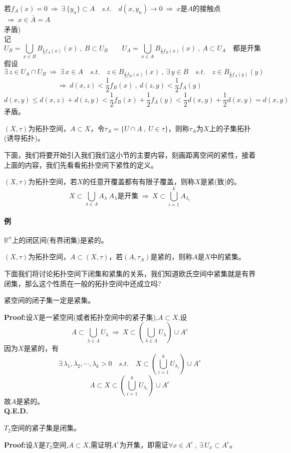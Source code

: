 若$f_A(x)=0 \ \Rightarrow \ \exists \, \{y_n\} \subset A \quad s.t. \quad d(x,y_n) \to 0 \ \Rightarrow \ x$是$A$的接触点$ \ \Rightarrow \ x \in \bar{A}=A$\\
矛盾)\\
记
\[U_B=\bigcup_{x \in B}B_{\frac{1}{2}f_A(x)}(x) \ , \ B \subset U_B \qquad U_A=\bigcup_{x \in A}B_{\frac{1}{2}f_B(x)}(x) \ , \ A \subset U_A \quad \text{都是开集}\]
假设
\[\exists \, z \in U_A \cap U_B \ \Rightarrow \ \exists \, x \in A \quad s.t. \quad z \in B_{\frac{1}{2}f_B(x)}(x) \ , \ \exists \, y \in B \quad s.t. \quad z \in B_{\frac{1}{2}f_A(y)}(y)\]
\[\Rightarrow \ d(x,z)<\frac{1}{2}f_B(x) \ , \ d(z,y)<\frac{1}{2}f_A(y)\]
\[d(x,y) \leq d(x,z)+d(z,y)<\frac{1}{2}f_B(x)+\frac{1}{2}f_A(y)<\frac{1}{2}d(x,y)+\frac{1}{2}d(x,y)=d(x,y)\]
矛盾。
\begin{definition}[子集拓扑]
    $(X,\tau)$为拓扑空间，$A \subset X$，令$\tau_A=\{U \cap A \ , \ U \in \tau\}$，则称$\tau_A$为$X$上的子集拓扑(诱导拓扑)。
\end{definition}
下面，我们将要开始引入我们我们这小节的主要内容，刻画距离空间的紧性，接着上面的内容，我们先看看拓扑空间下紧性的定义。
\begin{definition}[紧(致)性]
    $(X,\tau)$为拓扑空间，若$X$的任意开覆盖都有有限子覆盖，则称$X$是紧(致)的。
    \[X \subset \bigcup_{\lambda \in \Lambda}A_{\lambda} \ \text{$A_{\lambda}$是开集} \ \Rightarrow \ X \subset \bigcup_{i=1}^kA_{\lambda_i}\]
\end{definition}
\paragraph*{例} $\mathbb{R}^n$上的闭区间(有界闭集)是紧的。
\begin{definition}[紧集]
    $(X,\tau)$为拓扑空间，$A \subset (X,\tau)$，若$(A,\tau_A)$是紧的，则称$A$是$X$中的紧集。
\end{definition}
下面我们将讨论拓扑空间下闭集和紧集的关系，我们知道欧氏空间中紧集就是有界闭集，那么这个性质在一般的拓扑空间中还成立吗?
\begin{theorem}
    紧空间的闭子集一定是紧集。
\end{theorem}
\textbf{Proof:}设$X$是一紧空间(或者拓扑空间中的紧子集),$A \subset X$,设
\[A \subset \bigcup_{\lambda \in \Lambda}U_{\lambda} \ \Rightarrow \ X \subset \left(\bigcup_{\lambda \in \Lambda}U_{\lambda}\right) \cup A^c\]
因为$X$是紧的，有
\[\exists \, \lambda_1,\lambda_2,\cdots,\lambda_k>0 \quad s.t. \quad X \subset \left(\bigcup_{i=1}^kU_{\lambda_i}\right) \cup A^c\]
\[A \subset X \subset \left(\bigcup_{i=1}^kU_{\lambda_i}\right) \cup A^c\]
故$A$是紧的。\\
\textbf{Q.E.D.}
\begin{theorem}
    $T_2$空间的紧子集是闭集。
\end{theorem}
\textbf{Proof:}设$X$是$T_2$空间,$A \subset X$,需证明$A^c$为开集，即需证$\forall x \in A^c \ , \ \exists \, U_x \subset A^c$。

